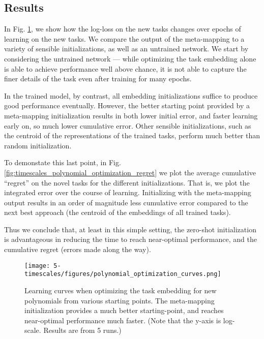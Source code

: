 \subsection{Results}
In Fig. \ref{fig:timescales_polynomial_optimization_curves}, we show how the log-loss on the new tasks changes over epochs of learning on the new tasks. We compare the output of the meta-mapping to a variety of sensible initializations, as well as an untrained network. We start by considering the untrained network --- while optimizing the task embedding alone is able to achieve performance well above chance, it is not able to capture the finer details of the task even after training for many epochs. \par
In the trained model, by contrast, all embedding initializations suffice to produce good performance eventually. However, the better starting point provided by a meta-mapping initialization results in both lower initial error, and faster learning early on, so much lower cumulative error. Other sensible initializations, such as the centroid of the representations of the trained tasks, perform much better than random initialization.\par
To demonstate this last point, in Fig. \ref{fig:timescales_polynomial_optimization_regret} we plot the average cumulative ``regret'' on the novel tasks for the different initializations. That is, we plot the integrated error over the course of learning. Initializing with the meta-mapping output results in an order of magnitude less cumulative error compared to the next best approach (the centroid of the embeddings of all trained tasks). \par
Thus we conclude that, at least in this simple setting, the zero-shot initialization is advantageous in reducing the time to reach near-optimal performance, and the cumulative regret (errors made along the way). \par 
\begin{figure}
\centering
\texttt{[image: 5-timescales/figures/polynomial\_optimization\_curves.png]}
\caption[Learning curves when optimizing the task embedding for new polynomials from various starting points.]{Learning curves when optimizing the task embedding for new polynomials from various starting points. The meta-mapping initialization provides a much better starting-point, and reaches near-optimal performance much faster. (Note that the y-axis is log-scale. Results are from 5 runs.)} \label{fig:timescales_polynomial_optimization_curves}
\end{figure}

